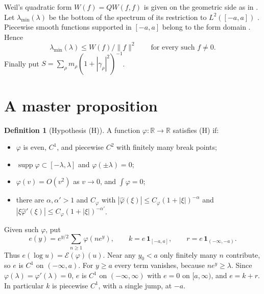 \documentclass[11pt]{amsart}
\theoremstyle{definition}
\newtheorem{definition}[proposition]{Definition}
\theoremstyle{remark}
\numberwithin{equation}{section}
\newcommand{\R}{\mathbb{R}}
\newcommand{\E}{\mathcal{E}}
\begin{document}
Weil's quadratic form $W(f)=QW(f,f)$ is given on the geometric side as in \cite[(3.19)]{CCM25}. Let $\lambda_{\min}(\lambda)$ be the bottom of the spectrum of its restriction to $L^2([-a,a])$ \cite[Thm.~3.6, Cor.~3.7]{CCM25}. Piecewise smooth functions supported in $[-a,a]$ belong to the form domain \cite[after (3.27)]{CCM25}. Hence
\begin{equation}\label{eq:rayleigh}
\lambda_{\min}(\lambda)\le W(f)/\|f\|^2\qquad\text{for every such }f\ne0 .
\end{equation}
Finally put $S=\sum_\rho m_\rho(1+|\gamma_\rho|^2)^{-1}$.

\section{A master proposition}\label{sec:master}

\begin{definition}[Hypothesis (H)]
A function $\varphi:\R\to\R$ satisfies (H) if:
\begin{itemize}
\item $\varphi$ is even, $C^1$, and piecewise $C^2$ with finitely many break points;
\item $\operatorname{supp}\varphi\subset[-\lambda,\lambda]$ and $\varphi(\pm\lambda)=0$;
\item $\varphi(v)=O(v^2)$ as $v\to0$, and $\int\varphi=0$;
\item there are $\alpha,\alpha'>1$ and $C_\varphi$ with $|\hat\varphi(\xi)|\le C_\varphi(1+|\xi|)^{-\alpha}$ and $|\xi\hat\varphi'(\xi)|\le C_\varphi(1+|\xi|)^{-\alpha'}$.
\end{itemize}
\end{definition}

Given such $\varphi$, put
\[
e(y)=e^{y/2}\sum_{n\ge1}\varphi(ne^y),\qquad k=e\,\mathbf 1_{[-a,a]},\qquad r=e\,\mathbf 1_{(-\infty,-a)} .
\]
Thus $e(\log u)=\E(\varphi)(u)$. Near any $y_0<a$ only finitely many $n$ contribute, so $e$ is $C^1$ on $(-\infty,a)$. For $y\ge a$ every term vanishes, because $ne^y\ge\lambda$. Since $\varphi(\lambda)=\varphi'(\lambda)=0$, $e$ is $C^1$ on $(-\infty,\infty)$ with $e=0$ on $[a,\infty)$, and $e=k+r$. In particular $k$ is piecewise $C^1$, with a single jump, at $-a$.
\end{document}
